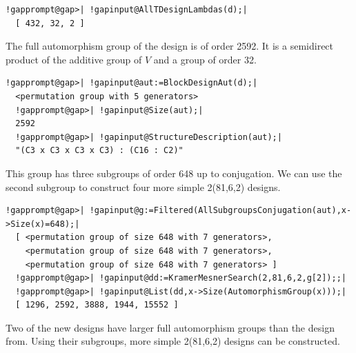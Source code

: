 \documentclass[a4paper,11pt]{report}
\begin{document}
{{{\begin{Verbatim}[commandchars=!@|,fontsize=\small,frame=single,label=Example]
  !gapprompt@gap>| !gapinput@AllTDesignLambdas(d);|
  [ 432, 32, 2 ]
\end{Verbatim}
 The full automorphism group of the design is of order 2592. It is a semidirect
product of the additive group of $V$ and a group of order 32. 
\begin{Verbatim}[commandchars=!@|,fontsize=\small,frame=single,label=Example]
  !gapprompt@gap>| !gapinput@aut:=BlockDesignAut(d);|
  <permutation group with 5 generators>
  !gapprompt@gap>| !gapinput@Size(aut);|
  2592
  !gapprompt@gap>| !gapinput@StructureDescription(aut);|
  "(C3 x C3 x C3 x C3) : (C16 : C2)"
\end{Verbatim}
 This group has three subgroups of order 648 up to conjugation. We can use the
second subgroup to construct four more simple 2\texttt{}(81,6,2)
designs. 
\begin{Verbatim}[commandchars=!@|,fontsize=\small,frame=single,label=Example]
  !gapprompt@gap>| !gapinput@g:=Filtered(AllSubgroupsConjugation(aut),x->Size(x)=648);|
  [ <permutation group of size 648 with 7 generators>, 
    <permutation group of size 648 with 7 generators>, 
    <permutation group of size 648 with 7 generators> ]
  !gapprompt@gap>| !gapinput@dd:=KramerMesnerSearch(2,81,6,2,g[2]);;|
  !gapprompt@gap>| !gapinput@List(dd,x->Size(AutomorphismGroup(x)));|
  [ 1296, 2592, 3888, 1944, 15552 ]
\end{Verbatim}
 Two of the new designs have larger full automorphism groups than the design
from{\nobreakspace}\cite{AN21}. Using their subgroups, more simple 2\texttt{}(81,6,2) designs can
be constructed. }

 
}}
\end{document}
